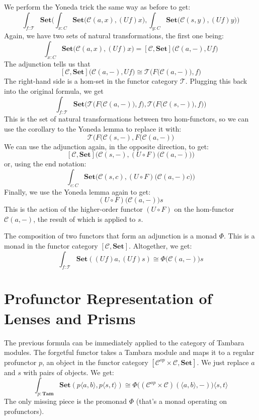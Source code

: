 \documentclass[11pt]{amsart}
\begin{document}
We perform the Yoneda trick the same way as before to get:
\[  \int_{f \colon \mathcal{T}}  \mathbf{Set}\Big(\int_{x \colon C} \mathbf{Set}\big(\mathcal{C}(a, x),(U f) x), \int_{y \colon C} \mathbf{Set}\big(\mathcal{C}(s, y),(U f) y\big)\Big)\]
Again, we have two sets of natural transformations, the first one being: 
\[\int_{x \colon C} \mathbf{Set}\big(\mathcal{C}(a, x), (U f) x\big) = [\mathcal{C}, \mathbf{Set}]\big(\mathcal{C}(a, -), U f\big)\]
The adjunction tells us that
\[ [\mathcal{C}, \mathbf{Set}]\big(\mathcal{C}(a, -), U f\big) \cong \mathcal{T}\Big(F\big(\mathcal{C}(a, -)\big), f\Big)\]
The right-hand side is a hom-set in the functor category $\mathcal{T}$. Plugging this back into the original formula, we get 
\[  \int_{f \colon \mathcal{T}}  \mathbf{Set}\Big(\mathcal{T}\Big(F\big(\mathcal{C}(a, -)\big), f\Big), \mathcal{T}\Big(F\big(\mathcal{C}(s, -)\big), f\Big) \Big)\]
This is the set of natural transformations between two hom-functors, so we can use the corollary to the Yoneda lemma to replace it with:
\[ \mathcal{T}\Big( F\big(\mathcal{C}(s, -), F\big(\mathcal{C}(a, -) \Big) \]
We can use the adjunction again, in the opposite direction, to get:
\[  [\mathcal{C}, \mathbf{Set}] \Big( \mathcal{C}(s, -), (U \circ F)\big(\mathcal{C}(a, -)\big) \Big) \]
or, using the end notation:
\[ \int_{c \colon C} \mathbf{Set} \Big(\mathcal{C}(s, c), (U \circ F)\big(\mathcal{C}(a, -) c \big)\Big) \]
Finally, we use the Yoneda lemma again to get:
\[ (U \circ F) \big( \mathcal{C}(a, -) \big) s \]
This is the action of the higher-order functor $(U \circ F)$ on the hom-functor $\mathcal{C}(a, -)$, the result of which is applied to $s$.

The composition of two functors that form an adjunction is a monad $\Phi$. This is a monad in the functor category $[\mathcal{C}, \mathbf{Set}]$. Altogether, we get:
\[ \int_{f \colon \mathcal{T}} \mathbf{Set}( (U f) a, (U f) s) \cong \Phi \big( \mathcal{C}(a, -) \big) s \]
\section{Profunctor Representation of Lenses and Prisms}
The previous formula can be immediately applied to the category of Tambara modules. The forgetful functor takes a Tambara module and maps it to a regular profunctor $p$, an object in the functor category $[\mathcal{C}^{op} \times \mathcal{C}, \mathbf{Set}]$. We just replace $a$ and $s$ with pairs of objects. We get:
\[ \int_{p \colon \mathbf{Tam}} \mathbf{Set}(p \langle a, b \rangle, p \langle s, t \rangle) \cong \Phi \big( (\mathcal{C}^{op} \times \mathcal{C})(\langle a, b \rangle, -) \big) \langle s, t \rangle\]
The only missing piece is the promonad $\Phi$ (that's a monad operating on profunctors).
\end{document}

